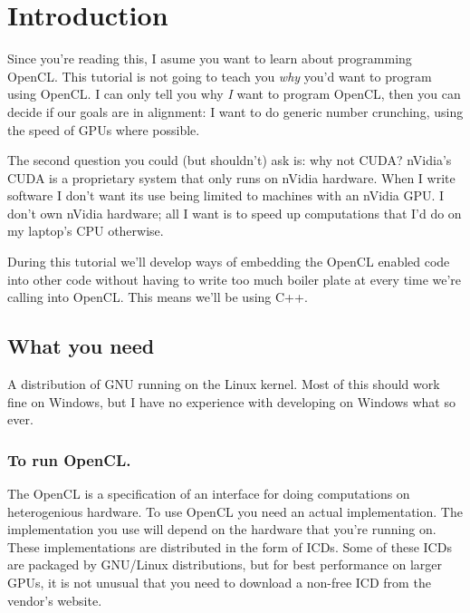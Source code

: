\documentclass{article}
\begin{document}
  \section{Introduction}
    Since you're reading this, I asume you want to learn about programming \ac{OpenCL}. This tutorial is not going to teach you \emph{why} you'd want to program using \ac{OpenCL}. I can only tell you why \emph{I} want to program \ac{OpenCL}, then you can decide if our goals are in alignment: I want to do generic number crunching, using the speed of \acp{GPU} where possible.

    The second question you could (but shouldn't) ask is: why not \acs{CUDA}? nVidia's \ac{CUDA} is a proprietary system that only runs on nVidia hardware. When I write software I don't want its use being limited to machines with an nVidia \ac{GPU}. I don't own nVidia hardware; all I want is to speed up computations that I'd do on my laptop's \acs{CPU} otherwise.

    During this tutorial we'll develop ways of embedding the \acs{OpenCL} enabled code into other code without having to write too much boiler plate at every time we're calling into \acs{OpenCL}. This means we'll be using C++.

    \subsection{What you need}
    A distribution of \acs{GNU} running on the Linux kernel. Most of this should work fine on Windows, but I have no experience with developing on Windows what so ever.

    \subsubsection{To run \acs{OpenCL}.}
    The \acf{OpenCL} is a specification of an interface for doing computations on heterogenious hardware. To use \ac{OpenCL} you need an actual implementation. The implementation you use will depend on the hardware that you're running on. These implementations are distributed in the form of \acfp{ICD}. Some of these \acp{ICD} are packaged by \acs{GNU}/Linux distributions, but for best performance on larger \acfp{GPU}, it is not unusual that you need to download a non-free \ac{ICD} from the vendor's website.
\end{document}
